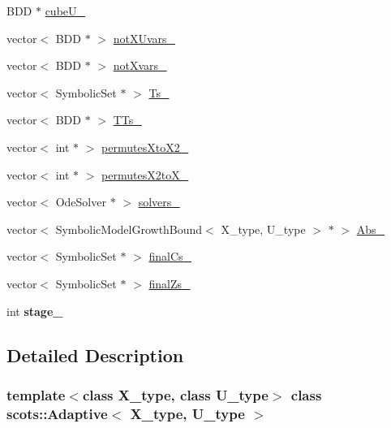 \begin{DoxyCompactItemize}
B\+DD $\ast$ \hyperlink{classscots_1_1Adaptive_a0332230a9bad14d432e6651611863be9}{cube\+U\+\_\+}
\item 
vector$<$ B\+DD $\ast$ $>$ \hyperlink{classscots_1_1Adaptive_ac3f203003011bcea5176ef294ab7a8a0}{not\+X\+Uvars\+\_\+}
\item 
vector$<$ B\+DD $\ast$ $>$ \hyperlink{classscots_1_1Adaptive_a8fbbf6976e589506c9e4c38045196c07}{not\+Xvars\+\_\+}
\item 
vector$<$ Symbolic\+Set $\ast$ $>$ \hyperlink{classscots_1_1Adaptive_ab9f37fda9e698b797079d28b243f3a5b}{Ts\+\_\+}
\item 
vector$<$ B\+DD $\ast$ $>$ \hyperlink{classscots_1_1Adaptive_a1f4c02094ecd380887640c83fc1d0310}{T\+Ts\+\_\+}
\item 
vector$<$ int $\ast$ $>$ \hyperlink{classscots_1_1Adaptive_ae954d4d3177bdc4093530e254ace2b34}{permutes\+Xto\+X2\+\_\+}
\item 
vector$<$ int $\ast$ $>$ \hyperlink{classscots_1_1Adaptive_a88edb6662310c07120d07c9dff968ddc}{permutes\+X2to\+X\+\_\+}
\item 
vector$<$ Ode\+Solver $\ast$ $>$ \hyperlink{classscots_1_1Adaptive_a0b300511b5f746c7b24ead30dc0ca9ac}{solvers\+\_\+}
\item 
vector$<$ Symbolic\+Model\+Growth\+Bound$<$ X\+\_\+type, U\+\_\+type $>$ $\ast$ $>$ \hyperlink{classscots_1_1Adaptive_ab51fe5639ecc8fd046c1d2d56fb25890}{Abs\+\_\+}
\item 
vector$<$ Symbolic\+Set $\ast$ $>$ \hyperlink{classscots_1_1Adaptive_a5a70ee2d2b4efe4f5eb20d08a596ec7b}{final\+Cs\+\_\+}
\item 
vector$<$ Symbolic\+Set $\ast$ $>$ \hyperlink{classscots_1_1Adaptive_af22209ae22c8b2dd921be22cc51a36dd}{final\+Zs\+\_\+}
\item 
\mbox{\label{classscots_1_1Adaptive_ae144310a281203fc51c67bf060bd9858}} 
int {\bfseries stage\+\_\+}
\end{DoxyCompactItemize}


\subsection{Detailed Description}
\subsubsection*{template$<$class X\+\_\+type, class U\+\_\+type$>$\newline
class scots\+::\+Adaptive$<$ X\+\_\+type, U\+\_\+type $>$}

